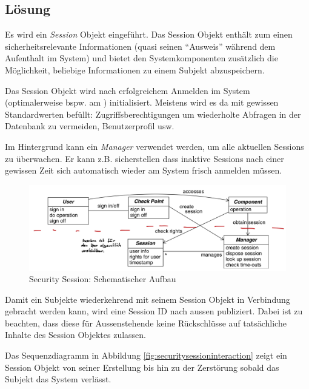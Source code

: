\subsection*{Lösung}
Es wird ein \emph{Session} Objekt eingeführt. Das Session Objekt enthält zum einen sicherheitsrelevante Informationen (quasi seinen ``Ausweis'' während dem Aufenthalt im System) und bietet den Systemkomponenten zusätzlich die Möglichkeit, beliebige Informationen zu einem Subjekt abzuspeichern.

Das Session Objekt wird nach erfolgreichem Anmelden im System (optimalerweise bspw. am ) initialisiert. Meistens wird es da mit gewissen Standardwerten befüllt: Zugriffsberechtigungen um wiederholte Abfragen in der Datenbank zu vermeiden, Benutzerprofil usw.

Im Hintergrund kann ein \emph{Manager} verwendet werden, um alle aktuellen Sessions zu überwachen. Er kann z.B. sicherstellen dass inaktive Sessions nach einer gewissen Zeit sich automatisch wieder am System frisch anmelden müssen.

\begin{figure}[H]
	\includegraphics[width=\textwidth]{content/system-access-control-architecture/images/security-session-structure.png}
	\caption{Security Session: Schematischer Aufbau \cite{SecPatterns06}}
\end{figure}

Damit ein Subjekte wiederkehrend mit seinem Session Objekt in Verbindung gebracht werden kann, wird eine Session ID nach aussen publiziert. Dabei ist zu beachten, dass diese für Aussenstehende keine Rückschlüsse auf tatsächliche Inhalte des Session Objektes zulassen.

Das Sequenzdiagramm in Abbildung \ref{fig:securitysessioninteraction} zeigt ein Session Objekt von seiner Erstellung bis hin zu der Zerstörung sobald das Subjekt das System verlässt.

